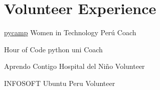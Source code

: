 \section{Volunteer Experience}

{\href{http://www.witperu.org/proyectos/teens-pycamp/}{pycamp}}
{Women in Technology Perú}
{Coach}{}
{}  

{Hour of Code}
{python uni}
{Coach}{}
{}  

{Aprendo Contigo}
{Hospital del Niño}
{Volunteer}{}
{}  

{INFOSOFT}
{Ubuntu Peru}
{Volunteer}{}
{}  
